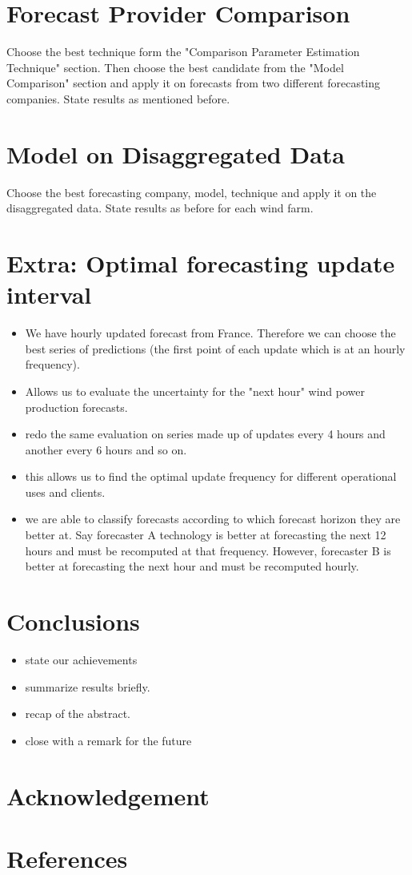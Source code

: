 \documentclass[10pt,twocolumn,letterpaper]{article}
\begin{document}
\section{Forecast Provider Comparison}
Choose the best technique form the "Comparison Parameter Estimation Technique" section. Then choose the best candidate from the "Model Comparison" section and apply it on forecasts from two different forecasting companies. State results as mentioned before.

\section{Model on Disaggregated Data}
Choose the best forecasting company, model, technique and  apply it on the disaggregated data. State results as before for each wind farm.

\section{Extra: Optimal forecasting update interval}
\begin{itemize}
    \item We have hourly updated forecast from France. Therefore we can choose the best series of predictions (the first point of each update which is at an hourly frequency).
    \item  Allows us to evaluate the uncertainty for the "next hour" wind power production forecasts.
    \item redo the same evaluation on series made up of updates every 4 hours and another every 6 hours and so on.
    \item this allows us to find the optimal update frequency for different operational uses and clients.
    \item we are able to classify forecasts according to which forecast horizon they are better at. Say forecaster A technology is better at forecasting the next 12 hours and must be recomputed at that frequency. However, forecaster B is better at forecasting the next hour and must be recomputed hourly.
\end{itemize}

\section{Conclusions}

\begin{itemize}
    \item state our achievements
    \item summarize results briefly.
    \item recap of the abstract.
    \item close with a remark for the future
\end{itemize}


\section*{Acknowledgement}

\section*{References}
\end{document}
